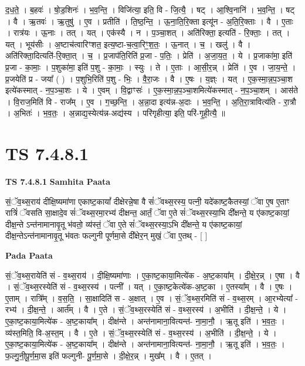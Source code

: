 \documentclass[17pt]{extarticle}
\begin{document}
द॒ध॒ते॒ । ब॒हवः॑ । षो॒ड॒शिनः॑ । भ॒व॒न्ति॒ । विजि॑त्या॒ इति॒ वि - जि॒त्यै॒ । षट् । आ॒श्वि॒नानि॑ । भ॒व॒न्ति॒ । षट् । वै । ऋ॒तवः॑ । ऋ॒तुषु॑ । ए॒व । प्रतीति॑ । ति॒ष्ठ॒न्ति॒ । ऊ॒ना॒ति॒रि॒क्ता इत्यू॑न - अ॒ति॒रि॒क्ताः । वै । ए॒ताः । रात्र॑यः । ऊ॒नाः । तत् । यत् । एक॑स्यै । न । प॒ञ्चा॒शत् । अति॑रिक्ता॒ इत्यति॑ - रि॒क्ताः॒ । तत् । यत् । भूय॑सीः । अ॒ष्टाच॑त्वारिꣳशत॒ इत्य॒ष्टा-च॒त्वा॒रिꣳ॒॒श॒तः॒ । ऊ॒नात् । च॒ । खलु॑ । वै । अति॑रिक्ता॒दित्यति॑-रि॒क्ता॒त् । च॒ । प्र॒जाप॑ति॒रिति॑ प्र॒जा - प॒तिः॒ । प्रेति॑ । अ॒जा॒य॒त॒ । ये । प्र॒जाका॑मा॒ इति॑ प्र॒जा - का॒माः॒ । प॒शुका॑मा॒ इति॑ प॒शु - का॒माः॒ । स्युः । ते । ए॒ताः । आ॒सी॒र॒न्न् । प्रेति॑ । ए॒व । जा॒य॒न्ते॒ । प्र॒जयेति॑ प्र - जया᳚ ( ) । प॒शुभि॒रिति॑ प॒शु - भिः॒ । वै॒रा॒जः । वै । ए॒षः । य॒ज्ञ्ः । यत् । ए॒क॒स्मा॒न्न॒प॒ञ्चा॒श इत्ये॑कस्मात् - न॒प॒ञ्चा॒शः । ये । ए॒वम् । वि॒द्वाꣳसः॑ । ए॒क॒स्मा॒न्न॒प॒ञ्चा॒शमित्ये॑कस्मात् - न॒प॒ञ्चा॒शम् । आस॑ते । वि॒राज॒मिति॑ वि - राज᳚म् । ए॒व । ग॒च्छ॒न्ति॒ । अ॒न्ना॒दा इत्य॑न्न-अ॒दाः । भ॒व॒न्ति॒ । अ॒ति॒रा॒त्रावित्य॑ति - रा॒त्रौ । अ॒भितः॑ । भ॒व॒तः॒ । अ॒न्नाद्य॒स्येत्य॑न्न-अद्य॑स्य । परि॑गृहीत्या॒ इति॒ परि॑-गृ॒ही॒त्यै॒ ॥  \newline





\section{ TS 7.4.8.1 }

\textbf{TS 7.4.8.1 } \newline
\textbf{Samhita Paata} \newline

सं॒ॅव॒थ्स॒राय॑ दीक्षि॒ष्यमा॑णा एकाष्ट॒कायां᳚ दीक्षेरन्ने॒षा वै सं॑ॅवथ्स॒रस्य॒ पत्नी॒ यदे॑काष्ट॒कैतस्यां॒ ॅवा ए॒ष ए॒ताꣳ रात्रिं॑ ॅवसति सा॒क्षादे॒व सं॑ॅवथ्स॒रमा॒रभ्य॑ दीक्षन्त॒ आर्तं॒ ॅवा ए॒ते सं॑ॅवथ्स॒रस्या॒भि दी᳚क्षन्ते॒ य ए॑काष्ट॒कायां॒ दीक्ष॒न्ते ऽन्त॑नामानावृ॒तू भ॑वतो॒ व्य॑स्तं॒ ॅवा ए॒ते सं॑ॅवथ्स॒रस्या॒ऽभि दी᳚क्षन्ते॒ य ए॑काष्ट॒कायां॒ दीक्ष॒न्तेऽन्त॑नामानावृ॒तू भ॑वतः फल्गुनी पूर्णमा॒से दी᳚क्षेर॒न् मुखं॒ ॅवा ए॒तथ् - [  ] \newline

\textbf{Pada Paata} \newline

सं॒ॅव॒थ्स॒रायेति॑ सं - व॒थ्स॒राय॑ । दी॒क्षि॒ष्यमा॑णाः । ए॒का॒ष्ट॒काया॒मित्ये॑क - अ॒ष्ट॒काया᳚म् । दी॒क्षे॒र॒न्न् । ए॒षा । वै । सं॒ॅव॒थ्स॒रस्येति॑ सं - व॒थ्स॒रस्य॑ । पत्नी᳚ । यत् । ए॒का॒ष्ट॒केत्ये॑क-अ॒ष्ट॒का । ए॒तस्या᳚म् । वै । ए॒षः । ए॒ताम् । रात्रि᳚म् । व॒स॒ति॒ । सा॒क्षादिति॑ स - अ॒क्षात् । ए॒व । सं॒ॅव॒थ्स॒रमिति॑ सं -  व॒थ्स॒रम् । आ॒रभ्येत्या᳚ - रभ्य॑ । दी॒क्ष॒न्ते॒ । आर्त᳚म् । वै । ए॒ते । सं॒ॅव॒थ्स॒रस्येति॑ सं - व॒थ्स॒रस्य॑ । अ॒भीति॑ । दी॒क्ष॒न्ते॒ । ये । ए॒का॒ष्ट॒काया॒मित्ये॑क - अ॒ष्ट॒काया᳚म् । दीक्ष॑न्ते । अन्त॑नामाना॒वित्यन्त॑- ना॒मा॒नौ॒ । ऋ॒तू इति॑ । भ॒व॒तः॒ । व्य॑स्त॒मिति॒ वि-अ॒स्त॒म् । वै । ए॒ते । सं॒ॅव॒थ्स॒रस्येति॑ सं - व॒थ्स॒रस्य॑ । अ॒भीति॑ । दी॒क्ष॒न्ते॒ । ये । ए॒का॒ष्ट॒काया॒मित्ये॑क - अ॒ष्ट॒काया᳚म् । दीक्ष॑न्ते । अन्त॑नामाना॒वित्यन्त॑- ना॒मा॒नौ॒ । ऋ॒तू इति॑ । भ॒व॒तः॒ । फ॒ल्गु॒नी॒पू॒र्ण॒मा॒स इति॑ फल्गुनी- पू॒र्ण॒मा॒से । दी॒क्षे॒र॒न्न् । मुख᳚म् । वै । ए॒तत् ।  \newline
\end{document}
